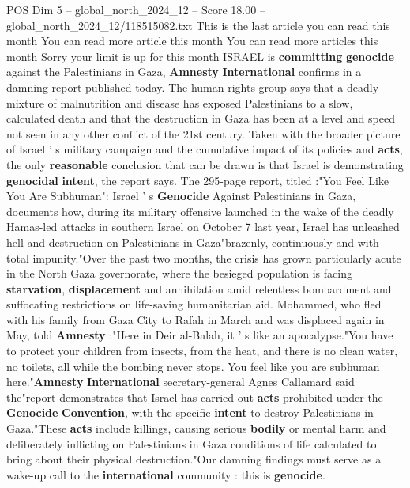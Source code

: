 \begin{textsample}{POS Dim 5 – global\_north\_2024\_12 – Score 18.00 – global\_north\_2024\_12/118515082.txt}  \label{ex:f5_pos_100}
This is the last article you can read this month You can read more article this month You can read more articles this month Sorry your limit is up for this month ISRAEL is \textbf{committing} \textbf{genocide} against the Palestinians in Gaza, \textbf{Amnesty} \textbf{International} confirms in a damning report published today.
The human rights group says that a deadly mixture of malnutrition and disease has exposed Palestinians to a slow, calculated death and that the destruction in Gaza has been at a level and speed not seen in any other conflict of the 21st century.
Taken with the broader picture of Israel ' s military campaign and the cumulative impact of its policies and \textbf{acts}, the only \textbf{reasonable} conclusion that can be drawn is that Israel is demonstrating \textbf{genocidal} \textbf{intent}, the report says.
The 295-page report, titled :"You Feel Like You Are Subhuman": Israel ' s \textbf{Genocide} Against Palestinians in Gaza, documents how, during its military offensive launched in the wake of the deadly Hamas-led attacks in southern Israel on October 7 last year, Israel has unleashed hell and destruction on Palestinians in Gaza"brazenly, continuously and with total impunity."Over the past two months, the crisis has grown particularly acute in the North Gaza governorate, where the besieged population is facing \textbf{starvation}, \textbf{displacement} and annihilation amid relentless bombardment and suffocating restrictions on life-saving humanitarian aid.
Mohammed, who fled with his family from Gaza City to Rafah in March and was displaced again in May, told \textbf{Amnesty} :"Here in Deir al-Balah, it ' s like an apocalypse."You have to protect your children from insects, from the heat, and there is no clean water, no toilets, all while the bombing never stops.
You feel like you are subhuman here."\textbf{Amnesty} \textbf{International} secretary-general Agnes Callamard said the"report demonstrates that Israel has carried out \textbf{acts} prohibited under the \textbf{Genocide} \textbf{Convention}, with the specific \textbf{intent} to destroy Palestinians in Gaza."These \textbf{acts} include killings, causing serious \textbf{bodily} or mental harm and deliberately inflicting on Palestinians in Gaza conditions of life calculated to bring about their physical destruction."Our damning findings must serve as a wake-up call to the \textbf{international} community : this is \textbf{genocide}.

\end{textsample}
